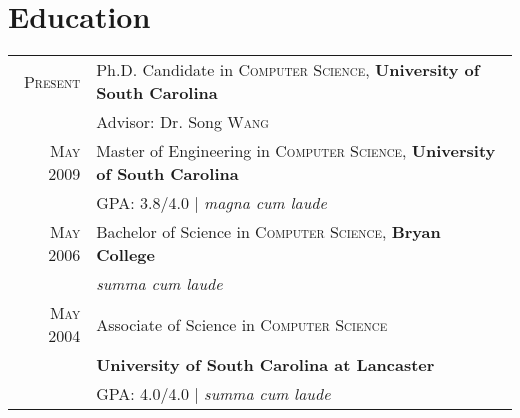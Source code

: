 \documentclass[a4paper,10pt]{article}
\begin{document}
\section{Education}
\begin{tabular}{r p{12cm}}
  \textsc{Present} & Ph.D. Candidate in \textsc{Computer Science}, \textbf{University of South Carolina}\\
  &%
  \small Advisor: Dr. Song \textsc{Wang} %
  \\%
  \textsc{May} 2009 & Master of Engineering in \textsc{Computer Science}, \textbf{University of South Carolina}\\
  &\normalsize \textsc{GPA}: 3.8/4.0 | \small\emph{magna cum laude}
\\%
\textsc{May} 2006& Bachelor of Science in \textsc{Computer Science}, \textbf{Bryan College} \\
&\normalsize 
\small\emph{summa cum laude}
\\%
\textsc{May} 2004& Associate of Science in \textsc{Computer Science}\\
&\textbf{University of South Carolina at Lancaster} \\
&\normalsize \textsc{GPA}: 4.0/4.0 | \small\emph{summa cum laude}\\
\end{tabular}
\end{document}
